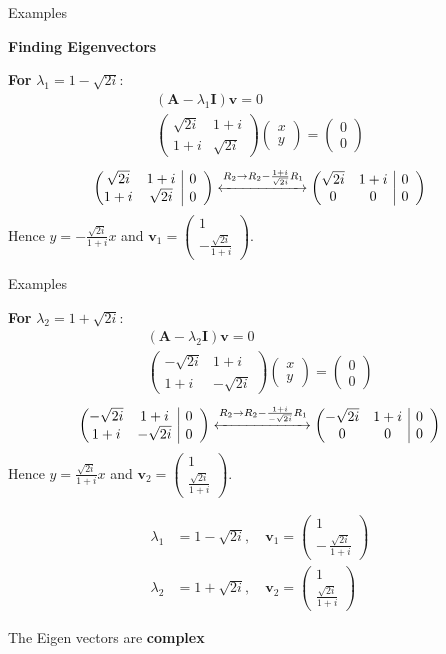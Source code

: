 \documentclass{beamer}
\makeatletter
\numberwithin{equation}{section}
\theoremstyle{remark}
\newcommand{\myvec}[1]{\ensuremath{\begin{pmatrix}#1\end{pmatrix}}}
\newenvironment{amatrix}[1]{%
  \left(\begin{array}{@{}*{#1}{c}|*{#1}{c}@{}}
}{%
  \end{array}\right)
}
\newcommand{\myaugvec}[2]{\ensuremath{\begin{amatrix}{#1}#2\end{amatrix}}}
\let\vec\mathbf
\makeatother
\begin{document}
\begin{frame}{Examples}

\textbf{Finding Eigenvectors}

\textbf{For } $\lambda_1 = 1 - \sqrt{2i}$:
\begin{align}
(\vec{A}-\lambda_1 \vec{I})\vec{v}=0\\
\myvec{\sqrt{2i} & 1+i\\ 1+i & \sqrt{2i}}\myvec{x\\y}=\myvec{0\\0}
\end{align}
\begin{align}
  \myaugvec{2}{\sqrt{2i} & 1+i & 0\\ 1+i & \sqrt{2i} & 0}
\xleftrightarrow{R_2 \to R_2 - \frac{1+i}{\sqrt{2i}}R_1}
  \myaugvec{2}{\sqrt{2i} & 1+i & 0\\ 0 & 0 & 0}
\end{align}
Hence $y = -\frac{\sqrt{2i}}{1+i}x$ and $\vec{v}_1 = \myvec{1\\ -\frac{\sqrt{2i}}{1+i}}$.

\end{frame}

\begin{frame}{Examples}

\textbf{For } $\lambda_2 = 1 + \sqrt{2i}$:
\begin{align}
(\vec{A}-\lambda_2 \vec{I})\vec{v}=0\\
\myvec{-\sqrt{2i} & 1+i\\ 1+i & -\sqrt{2i}}\myvec{x\\y}=\myvec{0\\0}
\end{align}
\begin{align}
  \myaugvec{2}{-\sqrt{2i} & 1+i & 0\\ 1+i & -\sqrt{2i} & 0}
\xleftrightarrow{R_2 \to R_2 - \frac{1+i}{-\sqrt{2i}}R_1}
  \myaugvec{2}{-\sqrt{2i} & 1+i & 0\\ 0 & 0 & 0}
\end{align}
Hence $y = \frac{\sqrt{2i}}{1+i}x$ and $\vec{v}_2 = \myvec{1\\ \frac{\sqrt{2i}}{1+i}}$.

\begin{align}
\lambda_1 &= 1 - \sqrt{2i}, \quad \vec{v}_1 = \myvec{1\\ -\,\frac{\sqrt{2i}}{1+i}}\\
\lambda_2 &= 1 + \sqrt{2i}, \quad \vec{v}_2 = \myvec{1\\ \frac{\sqrt{2i}}{1+i}}
\end{align}

The Eigen vectors are \textbf{complex}

\end{frame}
\end{document}
